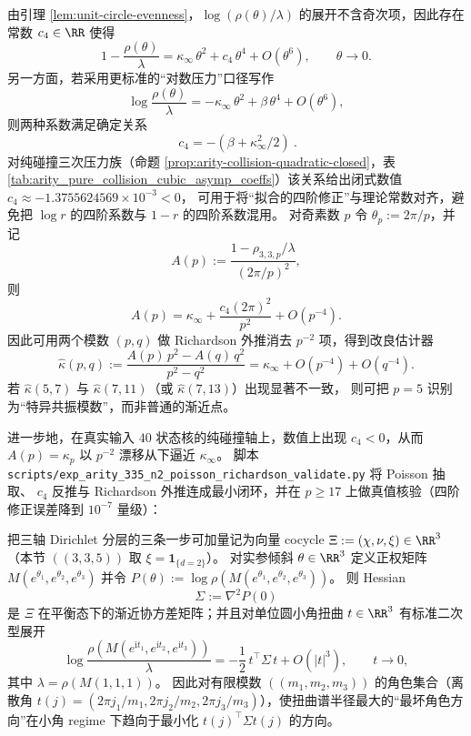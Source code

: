 \begin{remark}\label{rem:arity-335-richardson-kappa}
由引理 \ref{lem:unit-circle-evenness}，$\log(\rho(\theta)/\lambda)$ 的展开不含奇次项，因此存在常数 $c_4\in\RR$ 使得
\[
1-\frac{\rho(\theta)}{\lambda}
=\kappa_\infty\,\theta^2+c_4\,\theta^4+O(\theta^6),
\qquad \theta\to 0.
\]
另一方面，若采用更标准的“对数压力”口径写作
\[
\log\frac{\rho(\theta)}{\lambda}
=-\kappa_\infty\,\theta^2+\beta\,\theta^4+O(\theta^6),
\]
则两种系数满足确定关系
\[
\boxed{\ c_4=-(\beta+\kappa_\infty^2/2)\ }.
\]
对纯碰撞三次压力族（命题 \ref{prop:arity-collision-quadratic-closed}，表 \ref{tab:arity_pure_collision_cubic_asymp_coeffs}）该关系给出闭式数值
\(
c_4\approx -1.3755624569\times 10^{-3}<0
\)，
可用于将“拟合的四阶修正”与理论常数对齐，避免把 \(\log r\) 的四阶系数与 \(1-r\) 的四阶系数混用。
对奇素数 $p$ 令 $\theta_p:=2\pi/p$，并记
\[
A(p):=\frac{1-\rho_{3,3,p}/\lambda}{(2\pi/p)^2},
\]
则
\[
A(p)=\kappa_\infty+\frac{c_4(2\pi)^2}{p^2}+O(p^{-4}).
\]
因此可用两个模数 $(p,q)$ 做 Richardson 外推消去 $p^{-2}$ 项，得到改良估计器
\[
\widehat\kappa(p,q)
:=\frac{A(p)\,p^2-A(q)\,q^2}{p^2-q^2}
=\kappa_\infty+O(p^{-4})+O(q^{-4}).
\]
若 $\widehat\kappa(5,7)$ 与 $\widehat\kappa(7,11)$（或 $\widehat\kappa(7,13)$）出现显著不一致，
则可把 $p=5$ 识别为“特异共振模数”，而非普通的渐近点。
\par
进一步地，在真实输入 $40$ 状态核的纯碰撞轴上，数值上出现 \(c_4<0\)，从而
\(A(p)=\kappa_p\) 以 \(p^{-2}\) 漂移从下逼近 \(\kappa_\infty\)。
脚本 \texttt{scripts/exp\_arity\_335\_n2\_poisson\_richardson\_validate.py} 将 Poisson 抽取、
\(c_4\) 反推与 Richardson 外推连成最小闭环，并在 \(p\ge 17\) 上做真值核验（四阶修正误差降到 \(10^{-7}\) 量级）：

\end{remark}

\begin{remark}\label{prop:arity-335-worst-direction-cov}
把三轴 Dirichlet 分层的三条一步可加量记为向量 cocycle
\(
\Xi:=(\chi,\nu,\xi)\in\RR^3
\)
（本节 \(((3,3,5))\) 取 \(\xi=\mathbf{1}_{\{d=2\}}\)）。
对实参倾斜 \(\theta\in\RR^3\) 定义正权矩阵 \(M(e^{\theta_1},e^{\theta_2},e^{\theta_3})\) 并令
\(
P(\theta):=\log\rho(M(e^{\theta_1},e^{\theta_2},e^{\theta_3}))
\)。
则 Hessian
\[
\Sigma:=\nabla^2 P(0)
\]
是 \(\Xi\) 在平衡态下的渐近协方差矩阵；并且对单位圆小角扭曲 \(t\in\RR^3\) 有标准二次型展开
\[
\log\frac{\rho(M(e^{\mathrm{i}t_1},e^{\mathrm{i}t_2},e^{\mathrm{i}t_3}))}{\lambda}
=
-\frac12\,t^\top\Sigma\,t
+O(|t|^3),
\qquad t\to 0,
\]
其中 \(\lambda=\rho(M(1,1,1))\)。
因此对有限模数 \(((m_1,m_2,m_3))\) 的角色集合（离散角 \(t(j)=(2\pi j_1/m_1,2\pi j_2/m_2,2\pi j_3/m_3)\)），使扭曲谱半径最大的“最坏角色方向”在小角 regime 下趋向于最小化 \(t(j)^\top\Sigma t(j)\) 的方向。
\end{remark}


